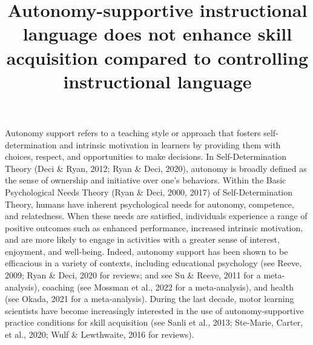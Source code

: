 \documentclass[
  man, donotrepeattitle,mask,floatsintext]{apa7}
\title{Autonomy-supportive instructional language does not enhance skill acquisition compared to controlling instructional language}
\author{\phantom{0}}
\date{}
\affiliation{\phantom{0}}
\begin{document}
\maketitle

Autonomy support refers to a teaching style or approach that fosters self-determination and intrinsic motivation in learners by providing them with choices, respect, and opportunities to make decisions. In Self-Determination Theory (Deci \& Ryan, 2012; Ryan \& Deci, 2020), autonomy is broadly defined as the sense of ownership and initiative over one's behaviors. Within the Basic Psychological Needs Theory (Ryan \& Deci, 2000, 2017) of Self-Determination Theory, humans have inherent psychological needs for autonomy, competence, and relatedness. When these needs are satisfied, individuals experience a range of positive outcomes such as enhanced performance, increased intrinsic motivation, and are more likely to engage in activities with a greater sense of interest, enjoyment, and well-being. Indeed, autonomy support has been shown to be efficacious in a variety of contexts, including educational psychology (see Reeve, 2009; Ryan \& Deci, 2020 for reviews; and see Su \& Reeve, 2011 for a meta-analysis), coaching (see Mossman et al., 2022 for a meta-analysis), and health (see Okada, 2021 for a meta-analysis). During the last decade, motor learning scientists have become increasingly interested in the use of autonomy-supportive practice conditions for skill acquisition (see Sanli et al., 2013; Ste-Marie, Carter, et al., 2020; Wulf \& Lewthwaite, 2016 for reviews).
\end{document}

